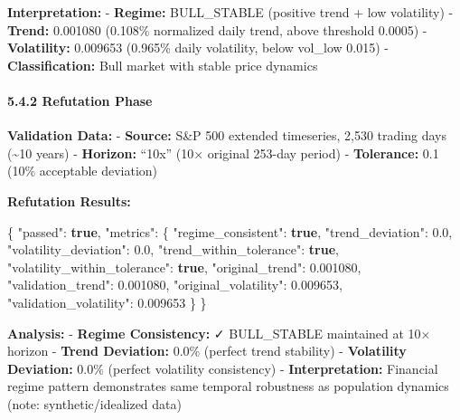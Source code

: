 \documentclass[
]{article}
\newenvironment{Shaded}{}{}
\newcommand{\DataTypeTok}[1]{\textcolor[rgb]{0.56,0.13,0.00}{#1}}
\newcommand{\FloatTok}[1]{\textcolor[rgb]{0.25,0.63,0.44}{#1}}
\newcommand{\FunctionTok}[1]{\textcolor[rgb]{0.02,0.16,0.49}{#1}}
\newcommand{\KeywordTok}[1]{\textcolor[rgb]{0.00,0.44,0.13}{\textbf{#1}}}
\begin{document}
\textbf{Interpretation:} - \textbf{Regime:} BULL\_STABLE (positive trend
+ low volatility) - \textbf{Trend:} 0.001080 (0.108\% normalized daily
trend, above threshold 0.0005) - \textbf{Volatility:} 0.009653 (0.965\%
daily volatility, below vol\_low 0.015) - \textbf{Classification:} Bull
market with stable price dynamics

\paragraph{5.4.2 Refutation Phase}\label{refutation-phase-1}

\textbf{Validation Data:} - \textbf{Source:} S\&P 500 extended
timeseries, 2,530 trading days (\textasciitilde10 years) -
\textbf{Horizon:} ``10x'' (10× original 253-day period) -
\textbf{Tolerance:} 0.1 (10\% acceptable deviation)

\textbf{Refutation Results:}

\begin{Shaded}
\begin{Highlighting}[]
\FunctionTok{\{}
  \DataTypeTok{"passed"}\FunctionTok{:} \KeywordTok{true}\FunctionTok{,}
  \DataTypeTok{"metrics"}\FunctionTok{:} \FunctionTok{\{}
    \DataTypeTok{"regime\_consistent"}\FunctionTok{:} \KeywordTok{true}\FunctionTok{,}
    \DataTypeTok{"trend\_deviation"}\FunctionTok{:} \FloatTok{0.0}\FunctionTok{,}
    \DataTypeTok{"volatility\_deviation"}\FunctionTok{:} \FloatTok{0.0}\FunctionTok{,}
    \DataTypeTok{"trend\_within\_tolerance"}\FunctionTok{:} \KeywordTok{true}\FunctionTok{,}
    \DataTypeTok{"volatility\_within\_tolerance"}\FunctionTok{:} \KeywordTok{true}\FunctionTok{,}
    \DataTypeTok{"original\_trend"}\FunctionTok{:} \FloatTok{0.001080}\FunctionTok{,}
    \DataTypeTok{"validation\_trend"}\FunctionTok{:} \FloatTok{0.001080}\FunctionTok{,}
    \DataTypeTok{"original\_volatility"}\FunctionTok{:} \FloatTok{0.009653}\FunctionTok{,}
    \DataTypeTok{"validation\_volatility"}\FunctionTok{:} \FloatTok{0.009653}
  \FunctionTok{\}}
\FunctionTok{\}}
\end{Highlighting}
\end{Shaded}

\textbf{Analysis:} - \textbf{Regime Consistency:} ✓ BULL\_STABLE
maintained at 10× horizon - \textbf{Trend Deviation:} 0.0\% (perfect
trend stability) - \textbf{Volatility Deviation:} 0.0\% (perfect
volatility consistency) - \textbf{Interpretation:} Financial regime
pattern demonstrates same temporal robustness as population dynamics
(note: synthetic/idealized data)
\end{document}

